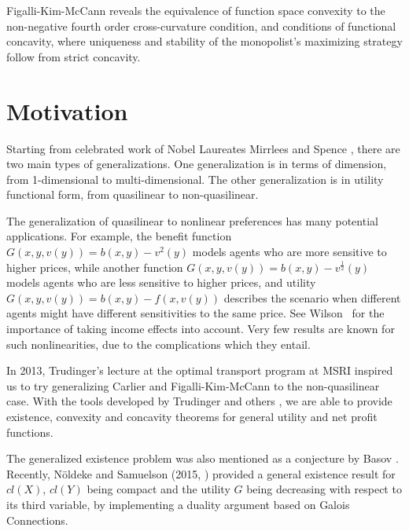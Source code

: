 Figalli-Kim-McCann \cite{FigalliKimMcCann11} reveals the equivalence of function space convexity to the non-negative fourth order cross-curvature condition, and conditions of functional concavity, where uniqueness and stability of the monopolist's maximizing strategy follow from strict concavity.\medskip



\section{Motivation}

Starting from celebrated work of Nobel Laureates Mirrlees \cite{Mirrlees71} and Spence \cite{Spence74}, there are two main types of generalizations. One generalization is in terms of dimension, from 1-dimensional to multi-dimensional. The other generalization is in utility functional form, from quasilinear to non-quasilinear.\medskip

The generalization of quasilinear to nonlinear preferences has many potential applications. For example, the benefit function $G(x,y,v(y))=b(x,y) -v^2(y)$ models agents who are more sensitive to higher prices, while another function $G(x,y,v(y))=b(x,y)-v^{\frac{1}{2}}(y)$ models agents who are less sensitive to higher prices, and utility $G(x,y,v(y))=b(x,y) -f(x, v(y))$ describes the scenario when different agents might have different sensitivities to the same price. See Wilson~\cite[Chapter 7]{Wilson93} for the importance of taking income effects into account. 
Very few results are known for such nonlinearities,  due to the complications which they entail. \medskip


	In 2013, Trudinger's lecture at the optimal transport program at MSRI inspired us to try generalizing Carlier \cite{Carlier01} and Figalli-Kim-McCann \cite{FigalliKimMcCann11} to the non-quasilinear case. With the tools developed by Trudinger \cite{Trudinger14} and others  \cite{Balder77,Singer97}, we are able to provide existence, convexity and concavity theorems for general utility and net profit functions. \medskip

	The generalized existence problem was also mentioned as a conjecture by Basov \cite[Chapter 8]{Basov05}. 
	Recently, N\"oldeke and Samuelson (2015, \cite{NoldekeSamuelson15p}) provided a general existence result for $cl(X)$, $cl(Y)$ being compact and the utility $G$ being decreasing with respect to its third variable, by implementing a duality argument based on Galois Connections. \medskip



